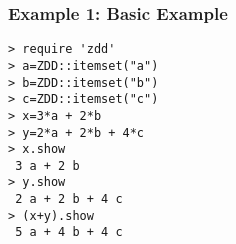 \subsubsection*{Example 1: Basic Example}



\begin{Verbatim}[baselinestretch=0.7,frame=single]
> require 'zdd'
> a=ZDD::itemset("a")
> b=ZDD::itemset("b")
> c=ZDD::itemset("c")
> x=3*a + 2*b
> y=2*a + 2*b + 4*c
> x.show
 3 a + 2 b
> y.show
 2 a + 2 b + 4 c
> (x+y).show
 5 a + 4 b + 4 c
\end{Verbatim}
